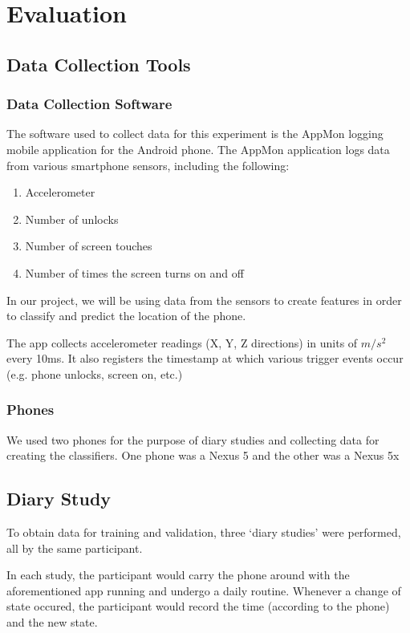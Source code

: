 \section{Evaluation}

\subsection{Data Collection Tools}
\subsubsection{Data Collection Software}
The software used to collect data for this experiment is the AppMon logging mobile application 
for the Android phone. 
The AppMon application logs data from various smartphone sensors, including the following:
\begin{enumerate}
\item Accelerometer
\item Number of unlocks
\item Number of screen touches
\item Number of times the screen turns on and off
\end{enumerate}

In our project, we will be using data from the sensors
to create features in order to classify and predict the location of the phone. 

The app collects accelerometer readings (X, Y, Z directions) in units of $m/s^2$ every 10ms.
It also registers the timestamp at which various trigger events occur (e.g. phone unlocks, screen on, etc.)

\subsubsection{Phones}
We used two phones for the purpose of diary studies and collecting data for creating the classifiers.
One phone was a Nexus 5 and the other was a Nexus 5x


\subsection {Diary Study}
To obtain data for training and validation, three `diary studies' were performed, all by the same participant.

In each study, the participant would carry the phone around with the aforementioned app running and undergo a daily routine.
Whenever a change of state occured, the participant would record the time (according to the phone) and the new state.

